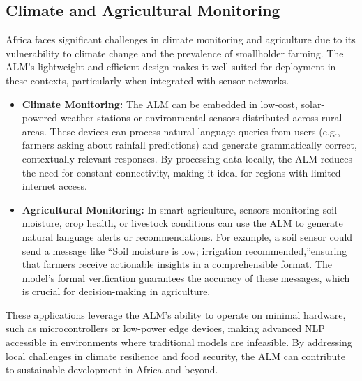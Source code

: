 \documentclass[11pt]{article}
\begin{document}
\subsection*{Climate and Agricultural Monitoring}
Africa faces significant challenges in climate monitoring and agriculture due to its vulnerability to climate change and the prevalence of smallholder farming. The ALM's lightweight and efficient design makes it well-suited for deployment in these contexts, particularly when integrated with sensor networks.
\begin{itemize}
    \item \textbf{Climate Monitoring:} The ALM can be embedded in low-cost, solar-powered weather stations or environmental sensors distributed across rural areas. These devices can process natural language queries from users (e.g., farmers asking about rainfall predictions) and generate grammatically correct, contextually relevant responses. By processing data locally, the ALM reduces the need for constant connectivity, making it ideal for regions with limited internet access.
    \item \textbf{Agricultural Monitoring:} In smart agriculture, sensors monitoring soil moisture, crop health, or livestock conditions can use the ALM to generate natural language alerts or recommendations. For example, a soil sensor could send a message like \textquotedblleft Soil moisture is low; irrigation recommended,\textquotedblright ensuring that farmers receive actionable insights in a comprehensible format. The model's formal verification guarantees the accuracy of these messages, which is crucial for decision-making in agriculture.
\end{itemize}
These applications leverage the ALM's ability to operate on minimal hardware, such as microcontrollers or low-power edge devices, making advanced NLP accessible in environments where traditional models are infeasible. By addressing local challenges in climate resilience and food security, the ALM can contribute to sustainable development in Africa and beyond.
\end{document}
